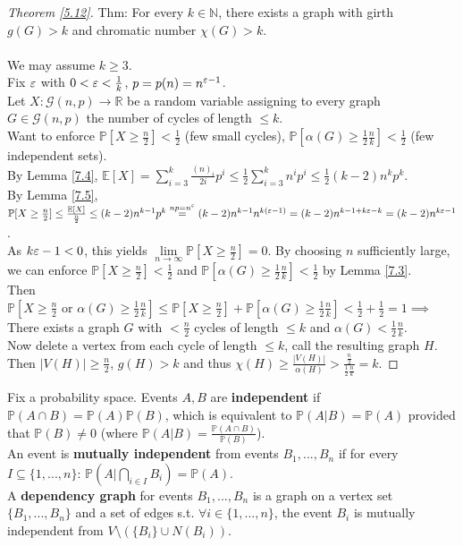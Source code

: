 \begin{proof}[Theorem \ref{5.12}]
    Thm: For every $k\in\mathbb{N}$, there exists a graph with girth $g(G)>k$ and chromatic number $\chi(G)>k$.\\
    \\
    We may assume $k\geq 3$.\\
    Fix $\varepsilon$ with $0<\varepsilon<\frac{1}{k}$, $p=p(n)=n^{\varepsilon-1}$.\\
    Let $X:\mathcal{G}(n,p)\to\mathbb{R}$ be a random variable assigning to every graph $G\in\mathcal{G}(n,p)$ the number of cycles of length $\leq k$. \\
    Want to enforce $\mathbb{P}[X\geq \frac{n}{2}]<\frac{1}{2}$ (few small cycles), $\mathbb{P}[\alpha(G)\geq \frac{1}{2}\frac{n}{k}]<\frac{1}{2}$ (few independent sets).\\
    By Lemma \ref{7.4}, $\mathbb{E}[X]=\sum\limits_{i=3}^k \frac{(n)_i}{2i}p^i\leq\frac{1}{2}\sum\limits_{i=3}^k n^ip^i\leq\frac{1}{2}(k-2)n^kp^k$.\\
    By Lemma \ref{7.5}, $\mathbb{P}[X\geq \frac{n}{2}]\leq\frac{\mathbb{E}[X]}{\frac{n}{2}}\leq (k-2)n^{k-1}p^k\stackrel{np=n^\varepsilon}{=}(k-2)n^{k-1}n^{k(\varepsilon-1)}=(k-2)n^{k-1+k\varepsilon-k}=(k-2)n^{k\varepsilon-1}$.\\
    As $k\varepsilon-1<0$, this yields $\lim\limits_{n\to\infty}\mathbb{P}[X\geq \frac{n}{2}]=0$. By choosing $n$ sufficiently large, we can enforce $\mathbb{P}[X\geq \frac{n}{2}]<\frac{1}{2}$ and $\mathbb{P}[\alpha(G)\geq \frac{1}{2}\frac{n}{k}]<\frac{1}{2}$ by Lemma \ref{7.3}.\\
    Then $\mathbb{P}[X\geq \frac{n}{2}\text{ or }\alpha(G)\geq \frac{1}{2}\frac{n}{k}]\leq\mathbb{P}[X\geq \frac{n}{2}]+\mathbb{P}[\alpha(G)\geq \frac{1}{2}\frac{n}{k}]<\frac{1}{2}+\frac{1}{2}=1\implies$ There exists a graph $G$ with $<\frac{n}{2}$ cycles of length $\leq k$ and $\alpha(G)<\frac{1}{2}\frac{n}{k}$.\\
    Now delete a vertex from each cycle of length $\leq k$, call the resulting graph $H$. Then $|V(H)|\geq\frac{n}{2}$, $g(H)>k$ and thus $\chi(H)\geq\frac{|V(H)|}{\alpha(H)}>\frac{\frac{n}{2}}{\frac{1}{2}\frac{n}{k}}=k$.
\end{proof}
\begin{definition}\label{7.6}
    Fix a probability space. Events $A,B$ are \textbf{independent} if $\mathbb{P}(A\cap B)=\mathbb{P}(A)\mathbb{P}(B)$, which is equivalent to $\mathbb{P}(A|B)=\mathbb{P}(A)$ provided that $\mathbb{P}(B)\neq 0$ (where $\mathbb{P}(A|B)=\frac{\mathbb{P}(A\cap B)}{\mathbb{P}(B)}$).\\
    An event is \textbf{mutually independent} from events $B_1,...,B_n$ if for every $I\subseteq\{1,...,n\}$: $\mathbb{P}(A|\bigcap_{i\in I} B_i)=\mathbb{P}(A)$.\\
    A \textbf{dependency graph} for events $B_1,...,B_n$ is a graph on a vertex set $\{B_1,...,B_n\}$ and a set of edges s.t. $\forall i\in\{1,...,n\}$, the event $B_i$ is mutually independent from $V\setminus(\{B_i\}\cup N(B_i))$.
\end{definition}
